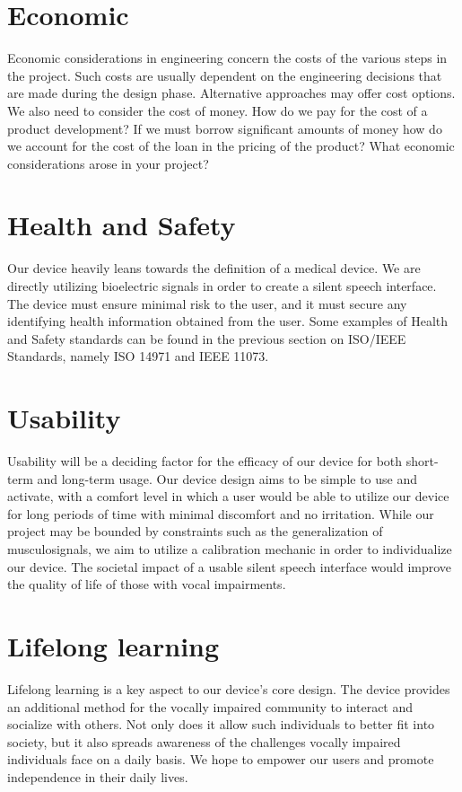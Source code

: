 \section{Economic}
Economic considerations in engineering concern the costs of the various steps in the project. Such costs are usually dependent on the engineering decisions that are made during the design phase. Alternative approaches may offer cost options. We also need to consider the cost of money. How do we pay for the cost of a product development? If we must borrow significant amounts of money how do we account for the cost of the loan in the pricing of the product? What economic considerations arose in your project?

\section{Health and Safety}
Our device heavily leans towards the definition of a medical device. We are directly utilizing bioelectric signals
 in order to create a silent speech interface. The device must ensure minimal risk to the user, and it must secure any
 identifying health information obtained from the user. Some examples of Health and Safety standards can be found in the previous
 section on ISO/IEEE Standards, namely ISO 14971 and IEEE 11073.

\section{Usability} 
Usability will be a deciding factor for the efficacy of our device for both short-term and long-term usage. Our device design aims to be simple to use and activate,
 with a comfort level in which a user would be able to utilize our device for long periods of time with minimal discomfort and no irritation. While our project may be bounded by constraints such
 as the generalization of musculosignals, we aim to utilize a calibration mechanic in order to individualize our device. The societal impact of a usable silent speech interface would
 improve the quality of life of those with vocal impairments.
 
\section{Lifelong learning}
Lifelong learning is a key aspect to our device's core design. The device provides an additional method for the vocally impaired community to interact and socialize with others.
 Not only does it allow such individuals to better fit into society, but it also spreads awareness of the challenges vocally impaired individuals face on a daily basis. We hope to
 empower our users and promote independence in their daily lives.

